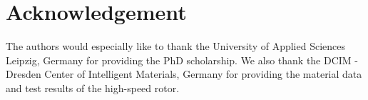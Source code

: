 \section*{Acknowledgement}
The authors would especially like to thank the University of Applied Sciences Leipzig, Germany
for providing the PhD scholarship.
We also thank the DCIM - Dresden Center of Intelligent Materials, Germany
for providing the material data and test results of the high-speed rotor.